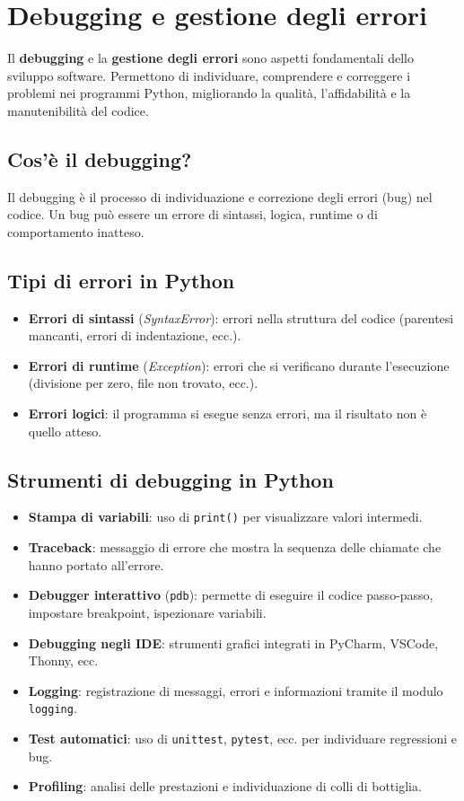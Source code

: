 \documentclass[a4paper,12pt]{article}
\begin{document}
\section{Debugging e gestione degli errori}
Il \textbf{debugging} e la \textbf{gestione degli errori} sono aspetti fondamentali dello sviluppo software. Permettono di individuare, comprendere e correggere i problemi nei programmi Python, migliorando la qualità, l'affidabilità e la manutenibilità del codice.

\subsection*{Cos'è il debugging?}
Il debugging è il processo di individuazione e correzione degli errori (bug) nel codice. Un bug può essere un errore di sintassi, logica, runtime o di comportamento inatteso.

\subsection*{Tipi di errori in Python}
\begin{itemize}
    \item \textbf{Errori di sintassi} (\textit{SyntaxError}): errori nella struttura del codice (parentesi mancanti, errori di indentazione, ecc.).
    \item \textbf{Errori di runtime} (\textit{Exception}): errori che si verificano durante l'esecuzione (divisione per zero, file non trovato, ecc.).
    \item \textbf{Errori logici}: il programma si esegue senza errori, ma il risultato non è quello atteso.
\end{itemize}

\subsection*{Strumenti di debugging in Python}
\begin{itemize}
    \item \textbf{Stampa di variabili}: uso di \texttt{print()} per visualizzare valori intermedi.
    \item \textbf{Traceback}: messaggio di errore che mostra la sequenza delle chiamate che hanno portato all'errore.
    \item \textbf{Debugger interattivo} (\texttt{pdb}): permette di eseguire il codice passo-passo, impostare breakpoint, ispezionare variabili.
    \item \textbf{Debugging negli IDE}: strumenti grafici integrati in PyCharm, VSCode, Thonny, ecc.
    \item \textbf{Logging}: registrazione di messaggi, errori e informazioni tramite il modulo \texttt{logging}.
    \item \textbf{Test automatici}: uso di \texttt{unittest}, \texttt{pytest}, ecc. per individuare regressioni e bug.
    \item \textbf{Profiling}: analisi delle prestazioni e individuazione di colli di bottiglia.
\end{itemize}
\end{document}
